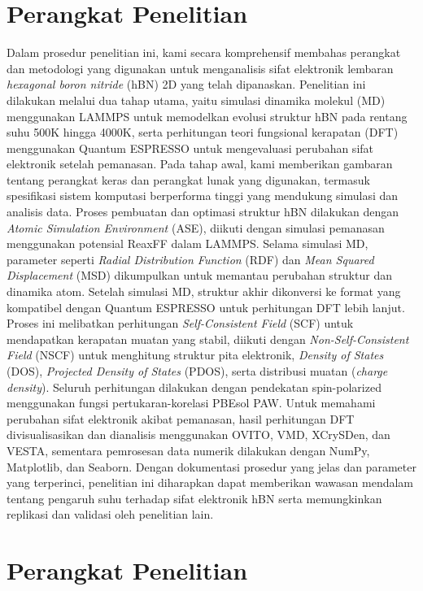 \bigskip

\section{Perangkat Penelitian}
Dalam prosedur penelitian ini, kami secara komprehensif membahas perangkat dan metodologi yang digunakan untuk menganalisis sifat elektronik lembaran \textit{hexagonal boron nitride} (hBN) 2D yang telah dipanaskan. Penelitian ini dilakukan melalui dua tahap utama, yaitu simulasi dinamika molekul (MD) menggunakan LAMMPS untuk memodelkan evolusi struktur hBN pada rentang suhu 500K hingga 4000K, serta perhitungan teori fungsional kerapatan (DFT) menggunakan Quantum ESPRESSO untuk mengevaluasi perubahan sifat elektronik setelah pemanasan. Pada tahap awal, kami memberikan gambaran tentang perangkat keras dan perangkat lunak yang digunakan, termasuk spesifikasi sistem komputasi berperforma tinggi yang mendukung simulasi dan analisis data. Proses pembuatan dan optimasi struktur hBN dilakukan dengan \textit{Atomic Simulation Environment} (ASE), diikuti dengan simulasi pemanasan menggunakan potensial ReaxFF dalam LAMMPS. Selama simulasi MD, parameter seperti \textit{Radial Distribution Function} (RDF) dan \textit{Mean Squared Displacement} (MSD) dikumpulkan untuk memantau perubahan struktur dan dinamika atom. Setelah simulasi MD, struktur akhir dikonversi ke format yang kompatibel dengan Quantum ESPRESSO untuk perhitungan DFT lebih lanjut. Proses ini melibatkan perhitungan \textit{Self-Consistent Field} (SCF) untuk mendapatkan kerapatan muatan yang stabil, diikuti dengan \textit{Non-Self-Consistent Field} (NSCF) untuk menghitung struktur pita elektronik, \textit{Density of States} (DOS), \textit{Projected Density of States} (PDOS), serta distribusi muatan (\textit{charge density}). Seluruh perhitungan dilakukan dengan pendekatan spin-polarized menggunakan fungsi pertukaran-korelasi PBEsol PAW. Untuk memahami perubahan sifat elektronik akibat pemanasan, hasil perhitungan DFT divisualisasikan dan dianalisis menggunakan OVITO, VMD, XCrySDen, dan VESTA, sementara pemrosesan data numerik dilakukan dengan NumPy, Matplotlib, dan Seaborn. Dengan dokumentasi prosedur yang jelas dan parameter yang terperinci, penelitian ini diharapkan dapat memberikan wawasan mendalam tentang pengaruh suhu terhadap sifat elektronik hBN serta memungkinkan replikasi dan validasi oleh penelitian lain. \section{Perangkat Penelitian}
